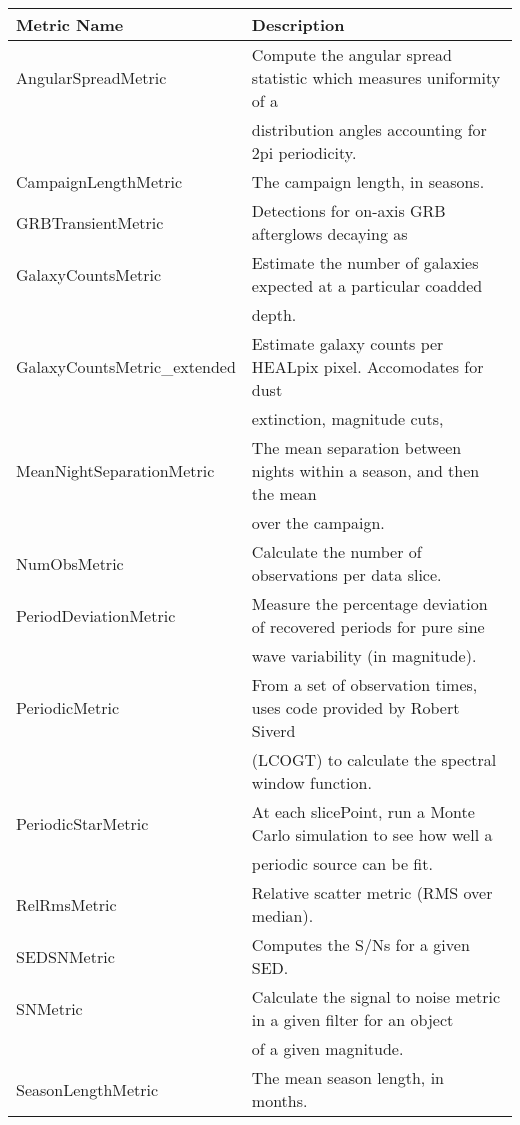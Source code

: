 \begin{table}
\scriptsize
\begin{tabular}{ll}
\hline
                 Metric Name &                                                             Description \\
\hline
 AngularSpreadMetric &  Compute the angular spread statistic which measures uniformity of a \\
  &  distribution angles accounting for 2pi periodicity. \\
 CampaignLengthMetric &  The campaign length, in seasons. \\
 GRBTransientMetric &  Detections for on-axis GRB afterglows decaying as \\
 GalaxyCountsMetric &  Estimate the number of galaxies expected at a particular coadded \\
  &  depth. \\
 GalaxyCountsMetric\_extended &  Estimate galaxy counts per HEALpix pixel. Accomodates for dust \\
  &  extinction, magnitude cuts, \\
 MeanNightSeparationMetric &  The mean separation between nights within a season, and then the mean \\
  &  over the campaign. \\
 NumObsMetric &  Calculate the number of observations per data slice. \\
 PeriodDeviationMetric &  Measure the percentage deviation of recovered periods for pure sine \\
  &  wave variability (in magnitude). \\
 PeriodicMetric &  From a set of observation times, uses code provided by Robert Siverd \\
  &  (LCOGT) to calculate the spectral window function. \\
 PeriodicStarMetric &  At each slicePoint, run a Monte Carlo simulation to see how well a \\
  &  periodic source can be fit. \\
 RelRmsMetric &  Relative scatter metric (RMS over median). \\
 SEDSNMetric &  Computes the S/Ns for a given SED. \\
 SNMetric &  Calculate the signal to noise metric in a given filter for an object \\
  &  of a given magnitude. \\
 SeasonLengthMetric &  The mean season length, in months. \\

\end{tabular}
\end{table}
